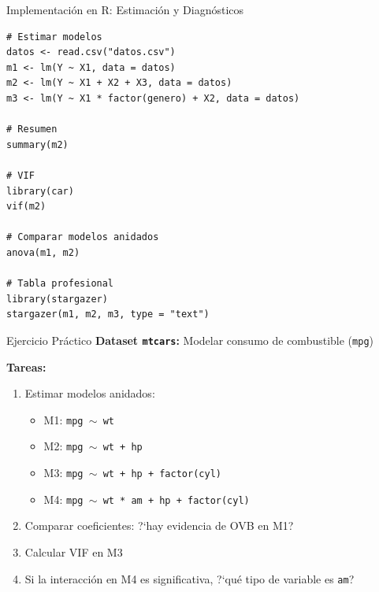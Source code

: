 \documentclass[aspectratio=169,11pt]{beamer}
\begin{document}
\begin{frame}[fragile]{Implementaci\'on en R: Estimaci\'on y Diagn\'osticos}
\tiny
\begin{lstlisting}
# Estimar modelos
datos <- read.csv("datos.csv")
m1 <- lm(Y ~ X1, data = datos)
m2 <- lm(Y ~ X1 + X2 + X3, data = datos)
m3 <- lm(Y ~ X1 * factor(genero) + X2, data = datos)

# Resumen
summary(m2)

# VIF
library(car)
vif(m2)

# Comparar modelos anidados
anova(m1, m2)

# Tabla profesional
library(stargazer)
stargazer(m1, m2, m3, type = "text")
\end{lstlisting}
\end{frame}

\begin{frame}{Ejercicio Pr\'actico}
\small
\textbf{Dataset \texttt{mtcars}:} Modelar consumo de combustible (\texttt{mpg})

\vspace{0.3cm}
\textbf{Tareas:}
\begin{enumerate}
    \setlength{\itemsep}{4pt}
    \item Estimar modelos anidados:
    \begin{itemize}
        \small
        \item M1: \texttt{mpg $\sim$ wt}
        \item M2: \texttt{mpg $\sim$ wt + hp}
        \item M3: \texttt{mpg $\sim$ wt + hp + factor(cyl)}
        \item M4: \texttt{mpg $\sim$ wt * am + hp + factor(cyl)}
    \end{itemize}
    \item Comparar coeficientes: ?`hay evidencia de OVB en M1?
    \item Calcular VIF en M3
    \item Si la interacci\'on en M4 es significativa, ?`qu\'e tipo de variable es \texttt{am}?
\end{enumerate}
\end{frame}
\end{document}
